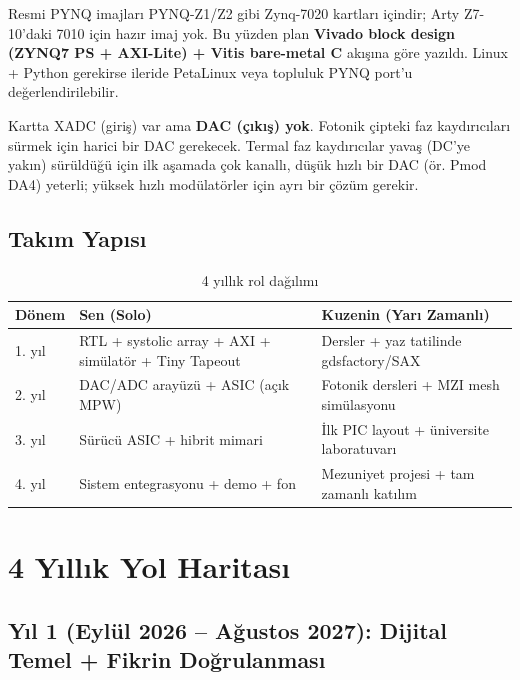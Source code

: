 \documentclass[11pt,a4paper]{article}
\begin{document}
\begin{warnbox}
Resmi PYNQ imajları PYNQ-Z1/Z2 gibi Zynq-7020 kartları içindir; Arty Z7-10'daki 7010 için hazır imaj yok. Bu yüzden plan \textbf{Vivado block design (ZYNQ7 PS + AXI-Lite) + Vitis bare-metal C} akışına göre yazıldı. Linux + Python gerekirse ileride PetaLinux veya topluluk PYNQ port'u değerlendirilebilir.
\end{warnbox}

\begin{notebox}
Kartta XADC (giriş) var ama \textbf{DAC (çıkış) yok}. Fotonik çipteki faz kaydırıcıları sürmek için harici bir DAC gerekecek. Termal faz kaydırıcılar yavaş (DC'ye yakın) sürüldüğü için ilk aşamada çok kanallı, düşük hızlı bir DAC (ör. Pmod DA4) yeterli; yüksek hızlı modülatörler için ayrı bir çözüm gerekir.
\end{notebox}

\subsection{Takım Yapısı}

\begin{table}[h!]
\centering
\small
\begin{tabular}{@{}p{2cm}p{6cm}p{6cm}@{}}
\toprule
\textbf{Dönem} & \textbf{Sen (Solo)} & \textbf{Kuzenin (Yarı Zamanlı)} \\
\midrule
1. yıl & RTL + systolic array + AXI + simülatör + Tiny Tapeout & Dersler + yaz tatilinde gdsfactory/SAX \\
2. yıl & DAC/ADC arayüzü + ASIC (açık MPW) & Fotonik dersleri + MZI mesh simülasyonu \\
3. yıl & Sürücü ASIC + hibrit mimari & İlk PIC layout + üniversite laboratuvarı \\
4. yıl & Sistem entegrasyonu + demo + fon & Mezuniyet projesi + tam zamanlı katılım \\
\bottomrule
\end{tabular}
\caption{4 yıllık rol dağılımı}
\end{table}

\section{4 Yıllık Yol Haritası}

\subsection{Yıl 1 (Eylül 2026 -- Ağustos 2027): Dijital Temel + Fikrin Doğrulanması}
\end{document}
